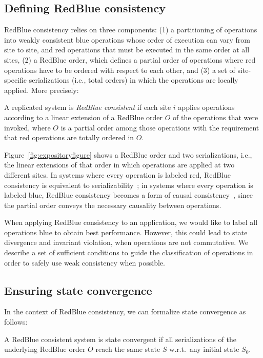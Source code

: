 \documentclass[11pt]{article}
\begin{document}
\subsection{Defining RedBlue consistency}

RedBlue consistency relies on three components: (1) a partitioning of operations into weakly consistent blue operations whose order of execution
can vary from site to site, and red operations that must
be executed in the same order at all sites, (2) a RedBlue order, which defines a partial order of
operations where red operations have to be ordered with respect to each other, and (3) a set of site-specific serializations (i.e., total orders)
in which the operations are locally applied. More precisely:

\begin{mydef}
A replicated system is {\em RedBlue consistent} if each site $i$ applies
operations according to a linear extension of a RedBlue order $O$ of the operations
that were invoked, where $O$ is a partial order among those operations with the requirement that red operations are totally ordered in $O$.
\label{def:rbct}
\end{mydef}

Figure~\ref{fig:expositoryfigure} shows a RedBlue order and two
serializations, i.e., the linear extensions of that order in which
operations are applied at two different sites. In systems where every operation is
labeled red, RedBlue consistency is equivalent to
serializability~\cite{Bernstein1987CCR}; in systems where every
operation is labeled blue, RedBlue consistency becomes a form of causal consistency~\cite{bayou,cops,
Mahajan2010Depot}, since the partial order conveys the necessary causality between operations.

When applying RedBlue consistency to an application, we would like to label all operations blue
to obtain best performance.
However, this could lead to state divergence and invariant violation, when operations are not commutative.
We describe a set of sufficient conditions to guide the classification of operations in order to safely use weak consistency
when possible.


\subsection{Ensuring state convergence}
In the context of RedBlue consistency, we can formalize state convergence as follows:

\begin{mydef}
A RedBlue consistent system is state convergent if all serializations of
the underlying RedBlue order $O$ reach the same state $S$ w.r.t.\ any initial state $S_0$.
\end{mydef}
\end{document}
